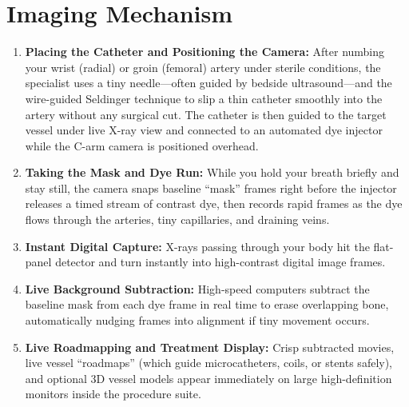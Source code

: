 \section{Imaging Mechanism}
\begin{enumerate}
\item \textbf{Placing the Catheter and Positioning the Camera:} After numbing your wrist (radial) or groin (femoral) artery under sterile conditions, the specialist uses a tiny needle---often guided by bedside ultrasound---and the wire-guided Seldinger technique to slip a thin catheter smoothly into the artery without any surgical cut. The catheter is then guided to the target vessel under live X-ray view and connected to an automated dye injector while the C-arm camera is positioned overhead.
\item \textbf{Taking the Mask and Dye Run:} While you hold your breath briefly and stay still, the camera snaps baseline ``mask'' frames right before the injector releases a timed stream of contrast dye, then records rapid frames as the dye flows through the arteries, tiny capillaries, and draining veins.
\item \textbf{Instant Digital Capture:} X-rays passing through your body hit the flat-panel detector and turn instantly into high-contrast digital image frames.
\item \textbf{Live Background Subtraction:} High-speed computers subtract the baseline mask from each dye frame in real time to erase overlapping bone, automatically nudging frames into alignment if tiny movement occurs.
\item \textbf{Live Roadmapping and Treatment Display:} Crisp subtracted movies, live vessel ``roadmaps'' (which guide microcatheters, coils, or stents safely), and optional 3D vessel models appear immediately on large high-definition monitors inside the procedure suite.
\end{enumerate}

